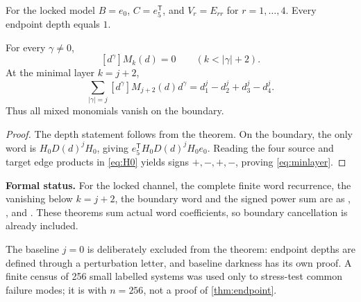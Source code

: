 For the locked model \(B=e_0\), \(C=e_5^{\mathsf T}\), and
\(V_r=E_{rr}\) for \(r=1,\ldots,4\).  Every endpoint depth equals \(1\).

\begin{corollary}\label{cor:sixsupport}
For every \(\gamma\ne0\),
\[
[d^\gamma]M_k(d)=0\qquad(k<|\gamma|+2).
\]
At the minimal layer \(k=j+2\),
\begin{equation}\label{eq:minlayer}
\sum_{|\gamma|=j}[d^\gamma]M_{j+2}(d)d^\gamma
=d_1^j-d_2^j+d_3^j-d_4^j.
\end{equation}
Thus all mixed monomials vanish on the boundary.
\end{corollary}
\begin{proof}
The depth statement follows from the theorem.  On the boundary, the only word
is \(H_0D(d)^jH_0\), giving
\(e_5^{\mathsf T}H_0D(d)^jH_0e_0\).  Reading the four source and target edge
products in \cref{eq:H0} yields signs \(+,-,+,-\), proving
\cref{eq:minlayer}.
\end{proof}

\noindent\textbf{Formal status.}
For the locked channel, the complete finite word recurrence, the vanishing
below $k=j+2$, the boundary word and the signed power sum are
 as ,
,
 and
.  These theorems sum actual word
coefficients, so boundary cancellation is already included.

The baseline \(j=0\) is deliberately excluded from the theorem: endpoint
depths are defined through a perturbation letter, and baseline darkness has its
own proof.  A finite census of 256 small labelled systems was used only to
stress-test common failure modes; it is  with \(n=256\), not
a proof of \cref{thm:endpoint}.
